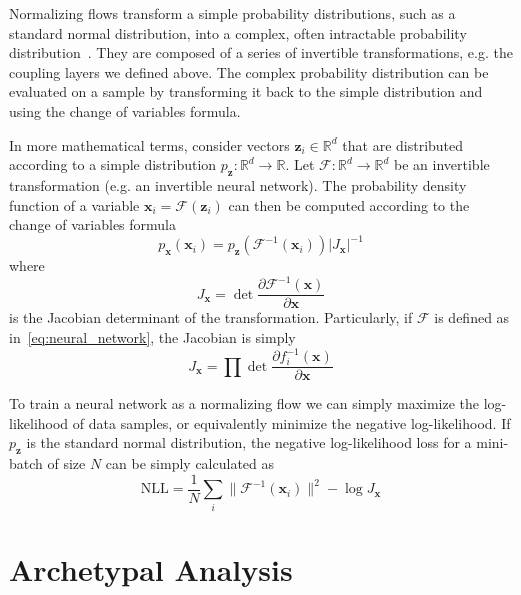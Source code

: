 Normalizing flows transform a simple probability distributions, such as a
standard normal distribution, into a complex, often intractable probability
distribution~\citep{kobyzevNormalizingFlowsIntroduction2020}. They are composed
of a series of invertible transformations, e.g. the coupling layers we defined
above. The complex probability distribution can be evaluated on a sample by
transforming it back to the simple distribution and using the change of
variables formula.

In more mathematical terms, consider vectors $\mathbf{z}_i \in \mathbb{R}^d$
that are distributed according to a simple distribution $p_{\mathbf{z}}:
\mathbb{R}^d \rightarrow \mathbb{R}$. Let $\mathcal{F}: \mathbb{R}^d
\rightarrow \mathbb{R}^d$ be an invertible transformation (e.g. an invertible
neural network). The probability density function of a variable $\mathbf{x}_i =
\mathcal{F} (\mathbf{z}_i)$ can then be computed according to the change of
variables formula
\begin{equation}%
    \label{eq:change_of_variables}
    p_{\mathbf{x}}(\mathbf{x}_i) =
    p_{\mathbf{z}}(\mathcal{F}^{-1}(\mathbf{x}_i)) \lvert J_{\mathbf{x}} \rvert^{-1}
\end{equation}
where
\begin{equation}%
    \label{eq:jacobian_det}
    J_{\mathbf{x}} = \det \frac{\partial \mathcal{F}^{-1} (\mathbf{x})}{\partial \mathbf{x}}
\end{equation}
is the Jacobian determinant of the transformation. Particularly, if
$\mathcal{F}$ is defined as in~\autoref{eq:neural_network}, the Jacobian is
simply
\begin{equation}%
    \label{eq:jacobian_chain_rule}
    J_{\mathbf{x}} = \prod \det \frac{\partial f_i^{-1} (\mathbf{x})}{\partial \mathbf{x}}
\end{equation}

To train a neural network as a normalizing flow we can simply maximize the
log-likelihood of data samples, or equivalently minimize the negative
log-likelihood. If $p_{\mathbf{z}}$ is the standard normal
distribution, the negative log-likelihood loss for a mini-batch of size $N$ can
be simply calculated as
\begin{equation}%
    \label{eq:nll_loss}
    \mathrm{NLL} = \frac{1}{N} \sum_i \lVert \mathcal{F}^{-1} (\mathbf{x}_i) \rVert^2 - \log J_{\mathbf{x}}
\end{equation}


\section{Archetypal Analysis}%
\label{sec:archetypal_analysis}
